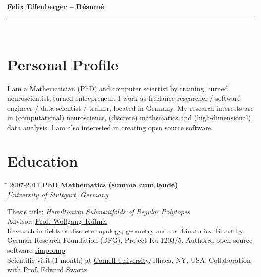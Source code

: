 \documentclass[10pt]{article} %
\newlength{\smallertextwidth}
\renewcommand{\title}[1]{
{\huge{\color{headercolor}\textbf{#1}}}\\
\rule{\textwidth}{0.5mm}\\
}
\newcommand{\education}[4]{
\begin{tabbing}%
\hspace{2.2cm}\=\kill%
{#1} \> \textbf{#2}\\
\>\+ \textit{#3}\\[3pt]
\begin{minipage}{\smallertextwidth}
\vspace{2mm}
#4
\end{minipage}
\end{tabbing}
\vspace{2mm}
}
\begin{document}

\title{Felix Effenberger -- Résumé}


\section{Personal Profile}
%
I am a Mathematician (PhD) and computer scientist by training, turned neuroscientist, turned entrepreneur. 
I work as freelance researcher / software engineer / data scientist / trainer, located in Germany.
My research interests are in (computational) neuroscience, (discrete) mathematics and (high-dimensional) data analysis.
I am also interested in creating open source software.


\section{Education}
%
\education
{2007-2011}
{PhD Mathematics \textmd{(summa cum laude)}}
{\href{https://uni-stuttgart.de}{University of Stuttgart, Germany}}
{
Thesis title: \textit{Hamiltonian Submanifolds of Regular Polytopes}\\
Advisor: \href{http://www.igt.uni-stuttgart.de/LstDiffgeo/Kuehnel/}{Prof.~Wolfgang~Kühnel}\\[5pt]
%
Research in fields of discrete topology, geometry and combinatorics.
Grant by German Research Foundation (DFG), Project Ku 1203/5.
Authored open source software \href{https://github.com/simpcomp-team/simpcomp}{simpcomp}.\\
Scientific visit (1 month) at \href{https://www.cornell.edu}{Cornell University}, Ithaca, NY, USA.
Collaboration with \href{http://pi.math.cornell.edu/~ebs/}{Prof. Edward Swartz}.
}
\end{document}

